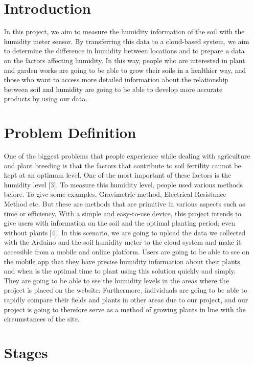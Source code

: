 \documentclass[14pt]{article}
\begin{document}
\section{Introduction}
In this project, we aim to measure the humidity information of the soil with the humidity meter sensor. By transferring this data to a cloud-based system, we aim to determine the difference in humidity between locations and to prepare a data on the factors affecting humidity. In this way, people who are interested in plant and garden works are going to be able to grow their soils in a healthier way, and those who want to access more detailed information about the relationship between soil and humidity are going to be able to develop more accurate products by using our data.

\section{Problem Definition}
One of the biggest problems that people experience while dealing with agriculture and plant breeding is that the factors that contribute to soil fertility cannot be kept at an optimum level. One of the most important of these factors is the humidity level [3]. To measure this humidity level, people used various methods before. To give some examples, Gravimetric method, Electrical Resistance Method etc. But these are methods that are primitive in various aspects such as time or efficiency. With a simple and easy-to-use device, this project intends to give users with information on the soil and the optimal planting period, even without plants [4]. In this scenario, we are going to upload the data we collected with the Arduino and the soil humidity meter to the cloud system and make it accessible from a mobile and online platform. Users are going to be able to see on the mobile app that they have precise humidity information about their plants and when is the optimal time to plant using this solution quickly and simply. They are going to be able to see the humidity levels in the areas where the project is placed on the website. Furthermore, individuals are going to be able to rapidly compare their fields and plants in other areas due to our project, and our project is going to therefore serve as a method of growing plants in line with the circumstances of the site. 



\section{Stages}
\end{document}
